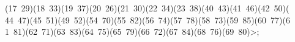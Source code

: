 \begin{tabbing}
(17\ 29)(18\ 33)(19\ 37)(20\ 26)(21\ 30)(22\ 34)(23\ 38)(40\ 43)(41\ 46)(42\ 50)(\\[0pt]
44\ 47)(45\ 51)(49\ 52)(54\ 70)(55\ 82)(56\ 74)(57\ 78)(58\ 73)(59\ 85)(60\ 77)(6\\[0pt]
1\ 81)(62\ 71)(63\ 83)(64\ 75)(65\ 79)(66\ 72)(67\ 84)(68\ 76)(69\ 80){\textgreater};\\[0pt]
\end{tabbing}
